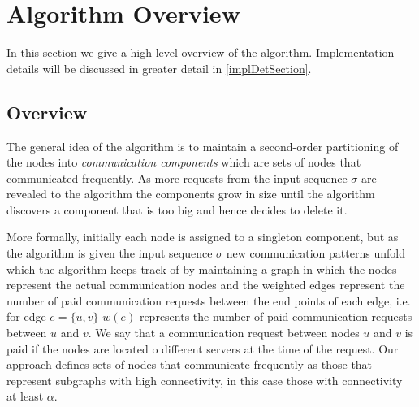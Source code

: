 \documentclass[xcolor=dvipsnames, tikz, 11pt]{article}
\newcommand{\nl}{\newline}
\theoremstyle{definition}
\begin{document}
	
	
	\section{Algorithm Overview}
	In this section we give a high-level overview of the algorithm. Implementation details will be discussed in greater detail in \cref{implDetSection}.
	
	\subsection{Overview}
	The general idea of the algorithm is to maintain a second-order partitioning of the nodes into \textit{communication components} which are sets of nodes that communicated frequently. As more requests from the input sequence $\sigma$ are revealed to the algorithm the components grow in size until the algorithm discovers a component that is too big and hence decides to delete it.\nl
	
	More formally, initially each node is assigned to a singleton component, but as the algorithm is given the input sequence $\sigma$ new communication patterns unfold which the algorithm keeps track of by maintaining a graph in which the nodes represent the actual communication nodes and the weighted edges represent the number of paid communication requests between the end points of each edge, i.e. for edge $e=\{u,v\}$ $w(e)$ represents the number of paid communication requests between $u$ and $v$. We say that a communication request between nodes $u$ and $v$ is paid if the nodes are located o different servers at the time of the request.\nl
	Our approach defines sets of nodes that communicate frequently as those that represent subgraphs with high connectivity, in this case those with connectivity at least $\alpha$.
	
\end{document}
